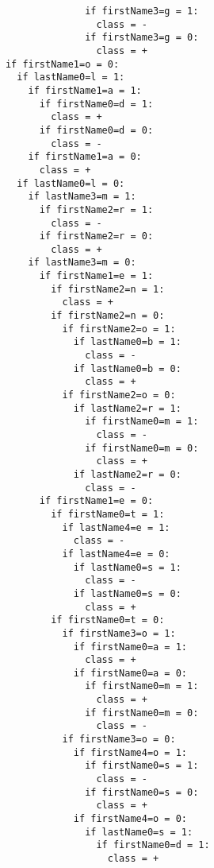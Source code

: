 \begin{verbatim}
                          if firstName3=g = 1: 
                            class = -
                          if firstName3=g = 0: 
                            class = +
            if firstName1=o = 0:
              if lastName0=l = 1:
                if firstName1=a = 1:
                  if firstName0=d = 1: 
                    class = +
                  if firstName0=d = 0: 
                    class = -
                if firstName1=a = 0: 
                  class = +
              if lastName0=l = 0:
                if lastName3=m = 1:
                  if firstName2=r = 1: 
                    class = -
                  if firstName2=r = 0: 
                    class = +
                if lastName3=m = 0:
                  if firstName1=e = 1:
                    if firstName2=n = 1: 
                      class = +
                    if firstName2=n = 0:
                      if firstName2=o = 1:
                        if lastName0=b = 1: 
                          class = -
                        if lastName0=b = 0: 
                          class = +
                      if firstName2=o = 0:
                        if lastName2=r = 1:
                          if firstName0=m = 1: 
                            class = -
                          if firstName0=m = 0: 
                            class = +
                        if lastName2=r = 0: 
                          class = -
                  if firstName1=e = 0:
                    if firstName0=t = 1:
                      if lastName4=e = 1: 
                        class = -
                      if lastName4=e = 0:
                        if lastName0=s = 1: 
                          class = -
                        if lastName0=s = 0: 
                          class = +
                    if firstName0=t = 0:
                      if firstName3=o = 1:
                        if firstName0=a = 1: 
                          class = +
                        if firstName0=a = 0:
                          if firstName0=m = 1: 
                            class = +
                          if firstName0=m = 0: 
                            class = -
                      if firstName3=o = 0:
                        if firstName4=o = 1:
                          if firstName0=s = 1: 
                            class = -
                          if firstName0=s = 0: 
                            class = +
                        if firstName4=o = 0:
                          if lastName0=s = 1:
                            if firstName0=d = 1: 
                              class = +

\end{verbatim}
